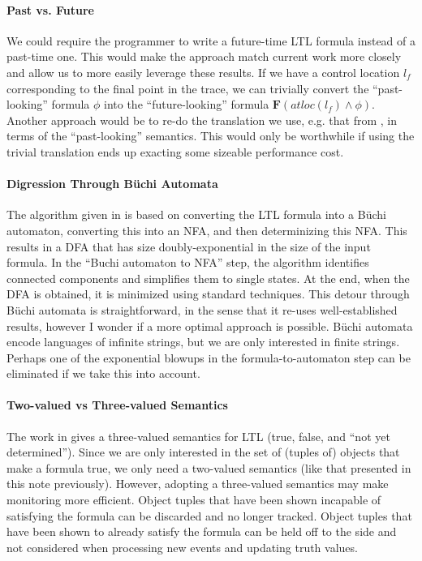 \documentclass{article}
\newcommand{\atloc}[1]{\mathit{atloc}(#1)}
\newcommand{\ltlF}{\mathbf{F}}
\begin{document}
\paragraph{Past vs. Future}  We could require the programmer to write a future-time LTL formula instead of a past-time one.  This would make the approach match current work more closely and allow us to more easily leverage these results.  If we have a control location $l_f$ corresponding to the final point in the trace, we can trivially convert the ``past-looking'' formula $\phi$ into the ``future-looking'' formula $\ltlF(\atloc{l_f} \wedge \phi)$.  Another approach would be to re-do the translation we use, e.g. that from \cite{runtime-verif-LTL}, in terms of the ``past-looking'' semantics.  This would only be worthwhile if using the trivial translation ends up exacting some sizeable performance cost.

\paragraph{Digression Through B\"uchi Automata}  The algorithm given in \cite{runtime-verif-LTL} is based on converting the LTL formula into a B\"uchi automaton, converting this into an NFA, and then determinizing this NFA.  This results in a DFA that has size doubly-exponential in the size of the input formula.  In the ``Buchi automaton to NFA'' step, the algorithm identifies connected components and simplifies them to single states.  At the end, when the DFA is obtained, it is minimized using standard techniques.  This detour through B\"uchi automata is straightforward, in the sense that it re-uses well-established results, however I wonder if a more optimal approach is possible.  B\"uchi automata encode languages of infinite strings, but we are only interested in finite strings.  Perhaps one of the exponential blowups in the formula-to-automaton step can be eliminated if we take this into account.

\paragraph{Two-valued vs Three-valued Semantics}

The work in \cite{runtime-verif-LTL} gives a three-valued semantics for LTL (true, false, and ``not yet determined'').  Since we are only interested in the set of (tuples of) objects that make a formula true, we only need a two-valued semantics (like that presented in this note previously).  However, adopting a three-valued semantics may make monitoring more efficient.  Object tuples that have been shown incapable of satisfying the formula can be discarded and no longer tracked.  Object tuples that have been shown to already satisfy the formula can be held off to the side and not considered when processing new events and updating truth values.
\end{document}
